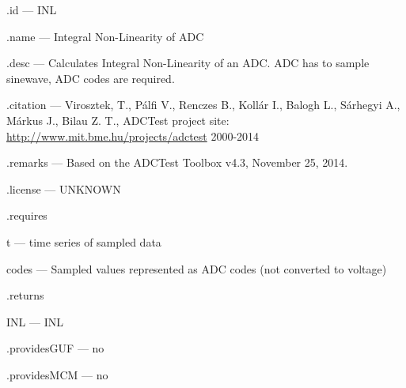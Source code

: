 \begin{tightdesc}
\item [\textsf{.id}] --- INL
\item [\textsf{.name}] --- Integral Non-Linearity of ADC
\item [\textsf{.desc}] --- Calculates Integral Non-Linearity of an ADC. ADC has to sample sinewave, ADC codes are required.
\item [\textsf{.citation}] --- Virosztek, T., Pálfi V., Renczes B., Kollár I., Balogh L., Sárhegyi A., Márkus J., Bilau Z. T., ADCTest project site: \url{http://www.mit.bme.hu/projects/adctest} 2000-2014
\item [\textsf{.remarks}] --- Based on the ADCTest Toolbox v4.3, November 25, 2014.
\item [\textsf{.license}] --- UNKNOWN
\item [\textsf{.requires}] \rule{0em}{0em}
\begin{tightdesc}
\item [\textsf{t}] --- time series of sampled data
\item [\textsf{codes}] --- Sampled values represented as ADC codes (not converted to voltage)
\end{tightdesc}
\item [\textsf{.returns}] \rule{0em}{0em}
\begin{tightdesc}
\item [\textsf{INL}] --- INL
\end{tightdesc}
\item [\textsf{.providesGUF}] --- no
\item [\textsf{.providesMCM}] ---  no
\end{tightdesc}
